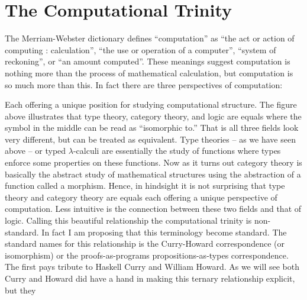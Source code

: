 \chapter{The Computational Trinity}
\label{chap:the_three_perspectives}
The Merriam-Webster dictionary defines ``computation'' as ``the act or
action of computing : calculation'', ``the use or operation of a
computer'', ``system of reckoning'', or ``an amount computed''.  These
meanings suggest computation is nothing more than the process of
mathematical calculation, but computation is so much more than this.
In fact there are three perspectives of computation:
\begin{center}
\end{center}
Each offering a unique position for studying computational structure.
The figure above illustrates that type theory, category theory, and
logic are equals where the symbol in the middle can be read as
``isomorphic to.''  That is all three fields look very different, but
can be treated as equivalent.  Type theories -- as we have seen above
-- or typed $\lambda$-calculi are essentially the study of functions
where types enforce some properties on these functions.  Now as it
turns out category theory is basically the abstract study of
mathematical structures using the abstraction of a function called a
morphism.  Hence, in hindsight it is not surprising that type theory
and category theory are equals each offering a unique perspective of
computation.  Less intuitive is the connection between these two
fields and that of logic.  Calling this beautiful relationship the
computational trinity is non-standard.  In fact I am proposing that
this terminology become standard.  The standard names for this
relationship is the Curry-Howard correspondence (or isomorphism) or the proofs-as-programs
propositions-as-types correspondence.  The first pays tribute to
Haskell Curry and William Howard. As we will see both Curry and Howard
did have a hand in making this ternary relationship explicit, but they
